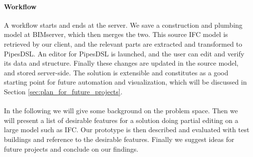 \paragraph{Workflow}
\label{sec:workflow}
A workflow starts and ends at the server. We save a construction and plumbing model at BIMserver, which then merges the two. This source IFC model is retrieved by our client, and the relevant parts are extracted and transformed to PipesDSL. An editor for PipesDSL is launched, and the user can edit and verify its data and structure. Finally these changes are updated in the source model, and stored server-side. The solution is extensible and constitutes as a good starting point for future automation and visualization, which will be discussed in Section \ref{sec:plan_for_future_projects}.

\paragraph{}
In the following we will give some background on the problem space. Then we will present a list of desirable features for a solution doing partial editing on a large model such as IFC. Our prototype is then described and evaluated with test buildings and reference to the desirable features. Finally we suggest ideas for future projects and conclude on our findings.
